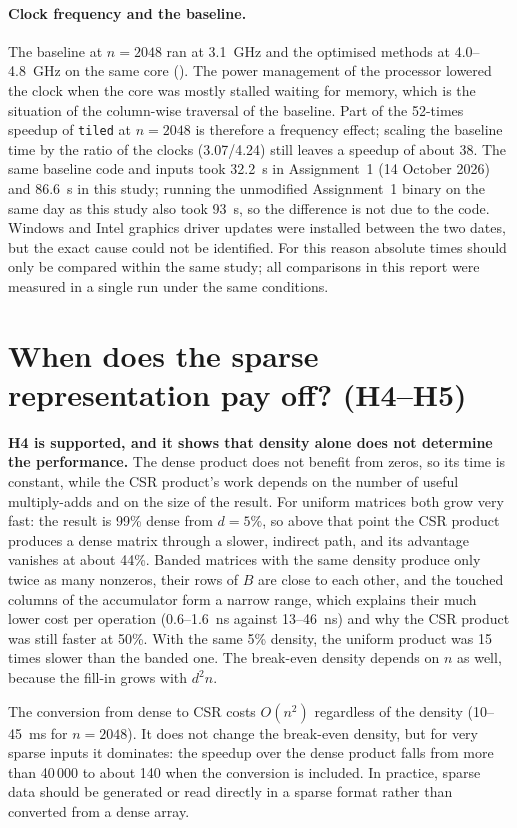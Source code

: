 \documentclass[12pt,a4paper]{report}
\begin{document}
\paragraph{Clock frequency and the baseline.} The baseline at $n = 2048$ ran at 3.1~GHz and the optimised methods at
4.0--4.8~GHz on the same core (). The power management of the processor lowered the clock when the core
was mostly stalled waiting for memory, which is the situation of the column-wise traversal of the baseline. Part of
the 52-times speedup of \texttt{tiled} at $n = 2048$ is therefore a frequency effect; scaling the baseline time by the
ratio of the clocks (3.07/4.24) still leaves a speedup of about 38. The same baseline code and inputs took 32.2~s in
Assignment~1 (14 October 2026) and 86.6~s in this study; running the unmodified Assignment~1 binary on the same day as
this study also took 93~s, so the difference is not due to the code. Windows and Intel graphics driver updates were
installed between the two dates, but the exact cause could not be identified. For this reason absolute times should
only be compared within the same study; all comparisons in this report were measured in a single run under the same
conditions.

\section{When does the sparse representation pay off? (H4--H5)}

\textbf{H4 is supported, and it shows that density alone does not determine the performance.} The dense product does
not benefit from zeros, so its time is constant, while the CSR product's work depends on the number of useful
multiply-adds and on the size of the result. For uniform matrices both grow very fast: the result is 99\% dense from
$d = 5\%$, so above that point the CSR product produces a dense matrix through a slower, indirect path, and its
advantage vanishes at about 44\%. Banded matrices with the same density produce only twice as many nonzeros, their
rows of $B$ are close to each other, and the touched columns of the accumulator form a narrow range, which explains
their much lower cost per operation (0.6--1.6~ns against 13--46~ns) and why the CSR product was still faster at 50\%.
With the same 5\% density, the uniform product was 15 times slower than the banded one. The break-even density
depends on $n$ as well, because the fill-in grows with $d^2 n$.

The conversion from dense to CSR costs $O(n^2)$ regardless of the density (10--45~ms for $n = 2048$). It does not
change the break-even density, but for very sparse inputs it dominates: the speedup over the dense product falls from
more than 40\,000 to about 140 when the conversion is included. In practice, sparse data should be generated or read
directly in a sparse format rather than converted from a dense array.
\end{document}
